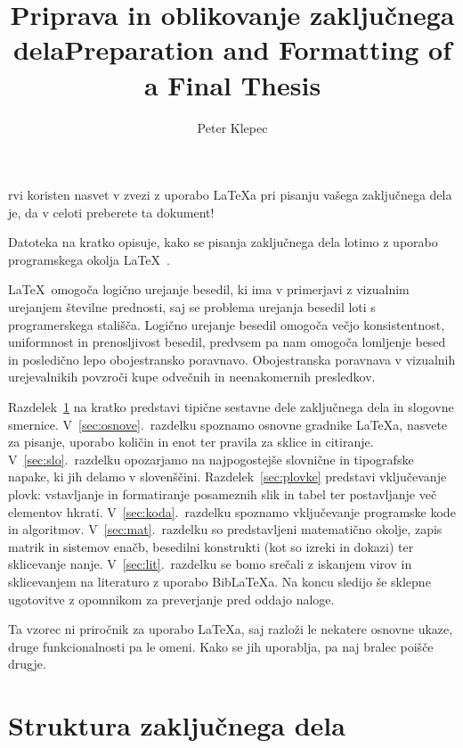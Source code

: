 \documentclass[9pt]{style/friteza}
\title[slovene]{Priprava in oblikovanje zaključnega dela}
\title[english]{Preparation and Formatting of a Final Thesis}
\author{Peter Klepec}
\begin{document}
\maketitle

rvi koristen nasvet v zvezi z uporabo \LaTeX{a} pri pisanju vašega zaključnega dela je, da v celoti preberete ta dokument!

Datoteka na kratko opisuje, kako se pisanja zaključnega dela lotimo z uporabo programskega okolja \LaTeX~\cite{lamport,nenajkrajsi}.

\LaTeX\ omogoča logično urejanje besedil, ki ima v primerjavi z vizualnim urejanjem številne prednosti, saj se problema urejanja besedil loti s programerskega stališča.
Logično urejanje besedil omogoča večjo konsistentnost, uniformnost in prenosljivost besedil, predvsem pa nam omogoča lomljenje besed in posledično lepo obojestransko poravnavo. Obojestranska poravnava v vizualnih urejevalnikih povzroči kupe odvečnih in neenakomernih presledkov. 

Razdelek~\ref{sec:struktura} na kratko predstavi tipične sestavne dele zaključnega dela in slogovne smernice.
V~\ref{sec:osnove}.~razdelku spoznamo osnovne gradnike \LaTeX{a}, nasvete za pisanje, uporabo količin in enot ter pravila za sklice in citiranje.
V~\ref{sec:slo}.~razdelku opozarjamo na najpogostejše slovnične in tipografske napake, ki jih delamo v slovenščini.
Razdelek~\ref{sec:plovke} predstavi vključevanje plovk: vstavljanje in formatiranje posameznih slik in tabel ter postavljanje več elementov hkrati.
V~\ref{sec:koda}.~razdelku spoznamo vključevanje programske kode in algoritmov.
V~\ref{sec:mat}.~razdelku so predstavljeni matematično okolje, zapis matrik in sistemov enačb, besedilni konstrukti (kot so izreki in dokazi) ter sklicevanje nanje.
V~\ref{sec:lit}.~razdelku se bomo srečali z iskanjem virov in sklicevanjem na literaturo z uporabo Bib\LaTeX{a}.
Na koncu sledijo še sklepne ugotovitve z opomnikom za preverjanje pred oddajo naloge.

Ta vzorec ni priročnik za uporabo \LaTeX{a}, saj razloži le nekatere osnovne ukaze, druge funkcionalnosti pa le omeni. Kako se jih uporablja, 
pa naj bralec poišče drugje.

\section{Struktura zaključnega dela}
\label{sec:struktura}
\end{document}
